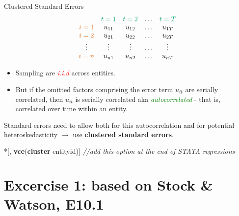 \documentclass[
  10pt,
  ignorenonframetext,
]{beamer}
\newenvironment{Shaded}{\begin{snugshade}}{\end{snugshade}}
\newcommand{\CommentTok}[1]{\textcolor[rgb]{0.56,0.35,0.01}{\textit{#1}}}
\newcommand{\KeywordTok}[1]{\textcolor[rgb]{0.13,0.29,0.53}{\textbf{#1}}}
\newcommand{\NormalTok}[1]{#1}
\begin{document}
\begin{frame}[fragile]{Clustered Standard Errors}
\protect\hypertarget{ClusteredSE}{}
\[
\begin{matrix}
    & {\color{green}{t=1}}     & {\color{green}{t=2}}    & \ldots & {\color{green}{t=T}}
\\
{\color{red}{i=1}} & u_{11}  & u_{12} & \ldots & u_{1T}
\\
{\color{red}{i=2}} & u_{21}  & u_{22} & \ldots & u_{2T}
\\
\vdots & \vdots & \vdots & \ldots & \vdots
\\
{\color{red}{i=n}} & u_{n1}  & u_{n2} & \ldots & u_{nT}
\\
\end{matrix}
\]

\begin{itemize}
\item
  Sampling are \textcolor{red}{\textit{i.i.d}} across entities.
\item
  But if the omitted factors comprising the error term \(u_{it}\) are
  serially correlated, then \(u_{it}\) is serially correlated aka
  \textcolor{green}{\textit{autocorrelated}} - that is, correlated over
  time within an entity.
\end{itemize}

Standard errors need to allow both for this autocorrelation and for
potential heteroskedasticity \(\rightarrow\) use \textbf{clustered
standard errors}.

\small

\begin{Shaded}
\begin{Highlighting}[]
\NormalTok{*[, }\KeywordTok{vce}\NormalTok{(}\KeywordTok{cluster}\NormalTok{ entityid)]}
\CommentTok{//add this option at the end of STATA regressions }
\end{Highlighting}
\end{Shaded}
\end{frame}

\hypertarget{excercise-1-based-on-stock-watson-e10.1}{%
\section{Excercise 1: based on Stock \& Watson,
E10.1}\label{excercise-1-based-on-stock-watson-e10.1}}
\end{document}

